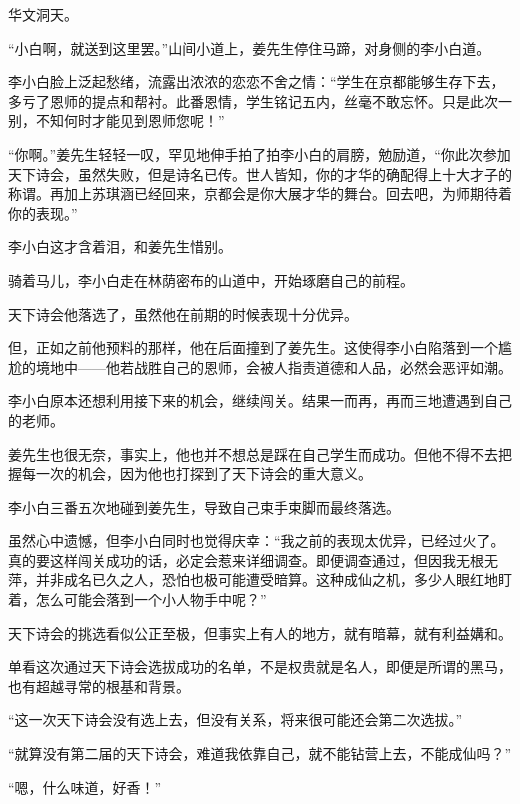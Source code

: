
\begin{this_body}



华文洞天。

“小白啊，就送到这里罢。”山间小道上，姜先生停住马蹄，对身侧的李小白道。

李小白脸上泛起愁绪，流露出浓浓的恋恋不舍之情：“学生在京都能够生存下去，多亏了恩师的提点和帮衬。此番恩情，学生铭记五内，丝毫不敢忘怀。只是此次一别，不知何时才能见到恩师您呢！”

“你啊。”姜先生轻轻一叹，罕见地伸手拍了拍李小白的肩膀，勉励道，“你此次参加天下诗会，虽然失败，但是诗名已传。世人皆知，你的才华的确配得上十大才子的称谓。再加上苏琪涵已经回来，京都会是你大展才华的舞台。回去吧，为师期待着你的表现。”

李小白这才含着泪，和姜先生惜别。

骑着马儿，李小白走在林荫密布的山道中，开始琢磨自己的前程。

天下诗会他落选了，虽然他在前期的时候表现十分优异。

但，正如之前他预料的那样，他在后面撞到了姜先生。这使得李小白陷落到一个尴尬的境地中——他若战胜自己的恩师，会被人指责道德和人品，必然会恶评如潮。

李小白原本还想利用接下来的机会，继续闯关。结果一而再，再而三地遭遇到自己的老师。

姜先生也很无奈，事实上，他也并不想总是踩在自己学生而成功。但他不得不去把握每一次的机会，因为他也打探到了天下诗会的重大意义。

李小白三番五次地碰到姜先生，导致自己束手束脚而最终落选。

虽然心中遗憾，但李小白同时也觉得庆幸：“我之前的表现太优异，已经过火了。真的要这样闯关成功的话，必定会惹来详细调查。即便调查通过，但因我无根无萍，并非成名已久之人，恐怕也极可能遭受暗算。这种成仙之机，多少人眼红地盯着，怎么可能会落到一个小人物手中呢？”

天下诗会的挑选看似公正至极，但事实上有人的地方，就有暗幕，就有利益媾和。

单看这次通过天下诗会选拔成功的名单，不是权贵就是名人，即便是所谓的黑马，也有超越寻常的根基和背景。

“这一次天下诗会没有选上去，但没有关系，将来很可能还会第二次选拔。”

“就算没有第二届的天下诗会，难道我依靠自己，就不能钻营上去，不能成仙吗？”

“嗯，什么味道，好香！”


\end{this_body}
